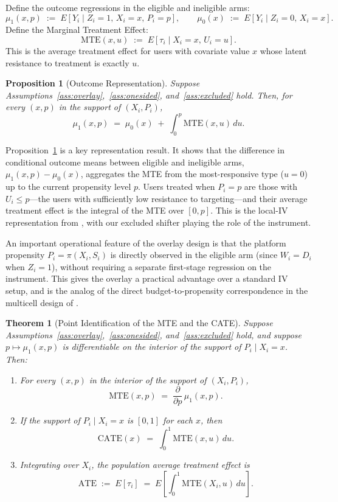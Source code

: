 \documentclass[11pt]{article}
\newtheorem{proposition}{Proposition}
\newtheorem{theorem}{Theorem}
\begin{document}
Define the outcome regressions in the eligible and ineligible arms:
\[
  \mu_1(x,p) \;:=\; E[Y_i \mid Z_i=1,\, X_i=x,\, P_i=p], \qquad
  \mu_0(x) \;:=\; E[Y_i \mid Z_i=0,\, X_i=x].
\]
Define the Marginal Treatment Effect:
\[
  \mathrm{MTE}(x,u) \;:=\; E[\tau_i \mid X_i=x,\, U_i=u].
\]
This is the average treatment effect for users with covariate value $x$ whose
latent resistance to treatment is exactly $u$.

\begin{proposition}[Outcome Representation]
\label{prop:representation}
Suppose Assumptions~\ref{ass:overlay},~\ref{ass:onesided}, and~\ref{ass:excluded}
hold.  Then, for every $(x,p)$ in the support of $(X_i, P_i)$,
\begin{equation}
  \mu_1(x,p) \;=\; \mu_0(x) \;+\; \int_0^p \mathrm{MTE}(x,u)\,du.
  \label{eq:representation}
\end{equation}
\end{proposition}

Proposition~\ref{prop:representation} is a key representation result.  It shows
that the difference in conditional outcome means between eligible and ineligible
arms, $\mu_1(x,p) - \mu_0(x)$, aggregates the MTE from the most-responsive type
($u=0$) up to the current propensity level $p$.  Users treated when $P_i = p$
are those with $U_i \leq p$---the users with sufficiently low resistance to
targeting---and their average treatment effect is the integral of the MTE over
$[0,p]$.  This is the local-IV representation from \citet{heckman2005structural},
with our excluded shifter playing the role of the instrument.

An important operational feature of the overlay design is that the platform
propensity $P_i = \pi(X_i, S_i)$ is directly observed in the eligible arm
(since $W_i = D_i$ when $Z_i=1$), without requiring a separate first-stage
regression on the instrument.  This gives the overlay a practical advantage over
a standard IV setup, and is the analog of the direct budget-to-propensity
correspondence in the multicell design of \citet{waisman2025multicell}.

\begin{theorem}[Point Identification of the MTE and the CATE]
\label{thm:pointid}
Suppose Assumptions~\ref{ass:overlay},~\ref{ass:onesided}, and~\ref{ass:excluded}
hold, and suppose $p \mapsto \mu_1(x,p)$ is differentiable on the interior of
the support of $P_i \mid X_i=x$.  Then:
\begin{enumerate}
  \item For every $(x,p)$ in the interior of the support of $(X_i, P_i)$,
  \[
    \mathrm{MTE}(x,p) \;=\; \frac{\partial}{\partial p}\,\mu_1(x,p).
  \]
  \item If the support of $P_i \mid X_i=x$ is $[0,1]$ for each $x$, then
  \[
    \mathrm{CATE}(x) \;=\; \int_0^1 \mathrm{MTE}(x,u)\,du.
  \]
  \item Integrating over $X_i$, the population average treatment effect is
  \[
    \mathrm{ATE} \;:=\; E[\tau_i] \;=\; E\!\left[\int_0^1 \mathrm{MTE}(X_i,u)\,du\right].
  \]
\end{enumerate}
\end{theorem}
\end{document}
